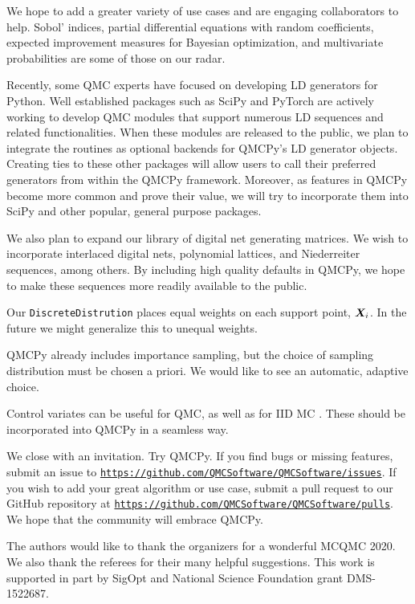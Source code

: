 \documentclass[graybox,footinfo]{svmult}
\begin{document}
We hope to add a greater variety of use cases and are engaging collaborators to help.  Sobol' indices, partial differential equations with random coefficients, expected improvement measures for Bayesian optimization, and multivariate probabilities are some of those on our radar.

Recently, some QMC experts have focused on developing LD generators for Python. Well established packages such as SciPy \cite{SCIPY} and PyTorch \cite{PyTorch} are actively working to develop QMC modules that support numerous LD sequences and related functionalities. When these modules are released to the public, we plan to integrate the routines as optional backends for QMCPy's LD generator objects. Creating ties to these other packages will allow users to call their preferred generators from within the QMCPy framework.  Moreover, as features in QMCPy become more common and prove their value, we will try to incorporate them into SciPy and other popular, general purpose packages.

We also plan to expand our library of digital net generating matrices. We wish to incorporate interlaced digital nets, polynomial lattices, and Niederreiter sequences, among others. By including high quality defaults in QMCPy, we hope to make these sequences more readily available to the public. 

Our \texttt{DiscreteDistrution} places equal weights on each support point, ${\boldsymbol{X}}_i$.  In the future we might generalize this to unequal weights.

QMCPy already includes importance sampling, but the choice of sampling distribution must be chosen a priori.  We would like to see an automatic, adaptive choice.

Control variates can be useful for QMC, as well as for IID MC \cite{HicEtal03}.  These should be incorporated into QMCPy in a seamless way.

We close with an invitation.  Try QMCPy.  If you find bugs or missing features, submit an issue to \href{https://github.com/QMCSoftware/QMCSoftware/issues}{\nolinkurl{https://github.com/QMCSoftware/QMCSoftware/issues}}.  If you wish to add your great algorithm or use case, submit a pull request to our GitHub repository at \href{https://github.com/QMCSoftware/QMCSoftware/pulls}{\nolinkurl{https://github.com/QMCSoftware/QMCSoftware/pulls}}.  We hope that the community will embrace QMCPy.

\begin{acknowledgement}
The authors would like to thank the organizers for a wonderful MCQMC 2020. 
We also thank the referees for their many helpful suggestions.  This work is supported in part by SigOpt and National Science Foundation grant DMS-1522687.
\end{acknowledgement}
\end{document}
